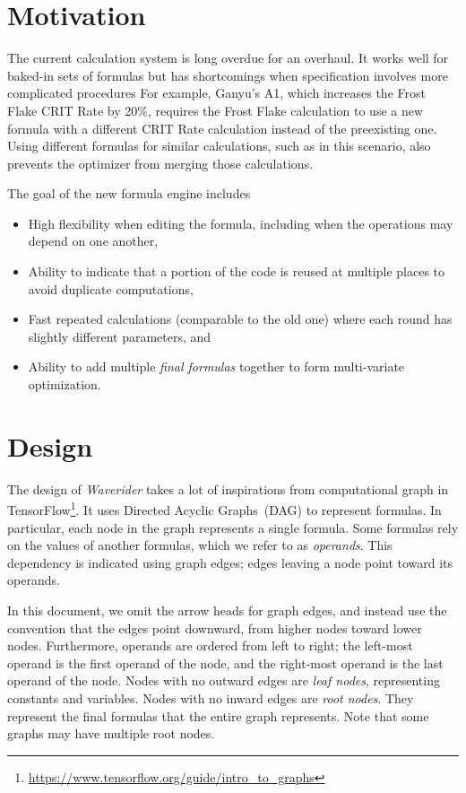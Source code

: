 \documentclass{article}
\begin{document}
\section{Motivation}

The current calculation system is long overdue for an overhaul.
It works well for baked-in sets of formulas but has shortcomings when specification involves more complicated procedures
For example, Ganyu's A1, which increases the Frost Flake CRIT Rate by 20\%, requires the Frost Flake calculation to use a new formula with a different CRIT Rate calculation instead of the preexisting one.
Using different formulas for similar calculations, such as in this scenario, also prevents the optimizer from merging those calculations.

The goal of the new formula engine includes

\begin{itemize}
	\item High flexibility when editing the formula, including when the operations may depend on one another,
	\item Ability to indicate that a portion of the code is reused at multiple places to avoid duplicate computations,
	\item Fast repeated calculations (comparable to the old one) where each round has slightly different parameters, and
	\item Ability to add multiple \emph{final formulas} together to form multi-variate optimization.
\end{itemize}

\section{Design}

The design of \emph{Waverider} takes a lot of inspirations from computational graph in TensorFlow\footnote{
	\url{https://www.tensorflow.org/guide/intro_to_graphs}
}.
It uses Directed Acyclic Graphs~(DAG) to represent formulas.
In particular, each node in the graph represents a single formula.
Some formulas rely on the values of another formulas, which we refer to as \emph{operands}.
This dependency is indicated using graph edges; edges leaving a node point toward its operands.

In this document, we omit the arrow heads for graph edges, and instead use the convention that the edges point downward, from higher nodes toward lower nodes.
Furthermore, operands are ordered from left to right; the left-most operand is the first operand of the node, and the right-most operand is the last operand of the node.
Nodes with no outward edges are \emph{leaf nodes}, representing constants and variables.
Nodes with no inward edges are \emph{root nodes}.
They represent the final formulas that the entire graph represents.
Note that some graphs may have multiple root nodes.
\end{document}
